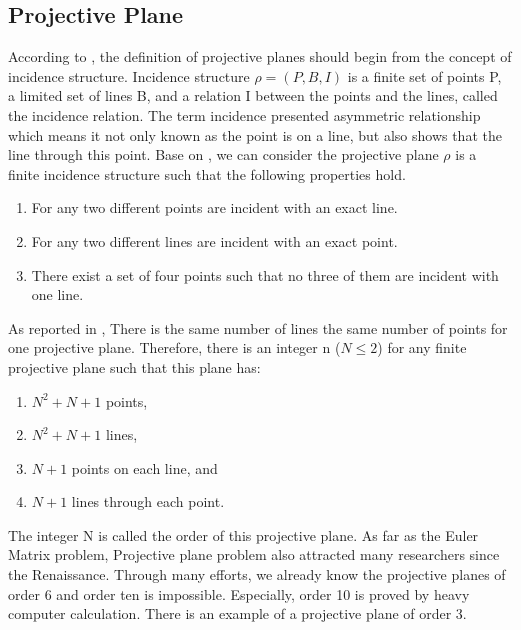 \documentclass[12pt]{article}
\begin{document}
\subsection{Projective Plane}

According to \cite{ref1}, the definition of projective planes should begin from the concept of incidence structure. Incidence structure $\rho = (P, B, I)$ is a finite set of points P, a limited set of lines B, and a relation I between the points and the lines, called the incidence relation. The term incidence presented asymmetric relationship which means it not only known as the point is on a line, but also shows that the line through this point. 
Base on \cite{ref1}, we can consider the projective plane $\rho$ is a finite incidence structure such that the following properties hold.

\begin{enumerate}[1.]
\item For any two different points are incident with an exact line.
\item For any two different lines are incident with an exact point.
\item There exist a set of four points such that no three of them are incident with one line.
\end{enumerate}

As reported in \cite{ref14}, There is the same number of lines the same number of points for one projective plane. Therefore, there is an integer n ($N\le2$) for any finite projective plane such that this plane has:

\begin{enumerate}[1.]
\item $N^2 + N + 1$ points,
\item $N^2 + N + 1$ lines,
\item $N + 1$ points on each line, and
\item $N + 1$ lines through each point.
\end{enumerate}

The integer N is called the order of this projective plane.
As far as the Euler Matrix problem, Projective plane problem also attracted many researchers since the Renaissance. Through many efforts, we already know the projective planes of order 6 and order ten is impossible. Especially, order 10 is proved by heavy computer calculation.
There is an example of a projective plane of order 3.
\end{document}
